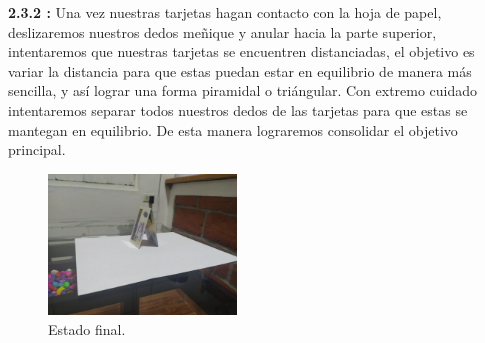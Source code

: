 \documentclass{article}
\begin{document}
\textbf{2.3.2 :} Una vez nuestras tarjetas hagan contacto con la hoja de papel, deslizaremos nuestros dedos meñique y anular hacia la parte superior, intentaremos que nuestras tarjetas se encuentren distanciadas, el objetivo es variar la distancia para que estas puedan estar en equilibrio de manera más sencilla, y así lograr una forma piramidal o triángular. Con extremo cuidado intentaremos separar todos nuestros dedos de las tarjetas para que estas se mantegan en equilibrio. De esta manera lograremos consolidar el objetivo principal.
\begin{figure}[h]
\includegraphics[width=5cm]{WhatsApp Image 2021-03-06 at 3.46.25 PM.jpeg}
\centering
\caption{Estado final.}
\label{fig:final}
\end{figure}



\end{document}
